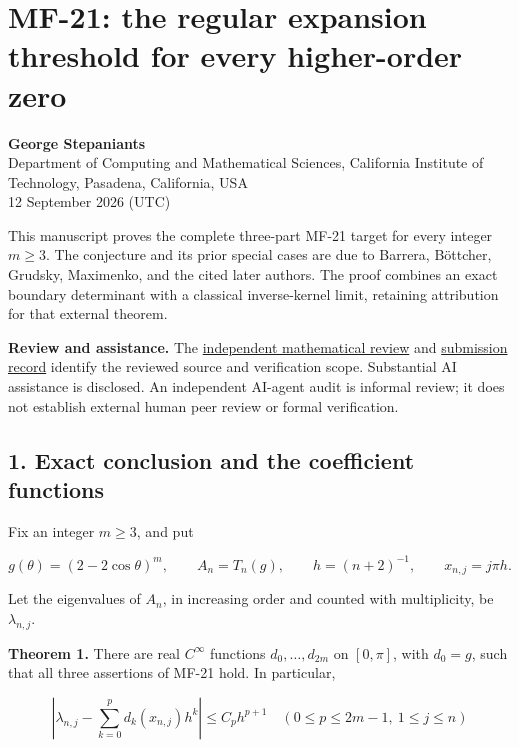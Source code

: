 \documentclass[10pt,a4paper]{article}
\begin{document}
\section*{MF-21: the regular expansion threshold for every higher-order zero}\label{mf-21-the-regular-expansion-threshold-for-every-higher-order-zero}

\textbf{George Stepaniants}\\
Department of Computing and Mathematical Sciences, California Institute of Technology, Pasadena, California, USA\\
12 September 2026 (UTC)

This manuscript proves the complete three-part MF-21 target for every integer \(m\ge3\). The conjecture and its prior special cases are due to Barrera, Böttcher, Grudsky, Maximenko, and the cited later authors. The proof combines an exact boundary determinant with a classical inverse-kernel limit, retaining attribution for that external theorem.

\textbf{Review and assistance.} The \href{https://github.com/ajt60gaibb/OpenProblemsInNLA/blob/main/references/stepaniants-mf21-2026-09-12/independent-review.md}{independent mathematical review} and \href{https://github.com/ajt60gaibb/OpenProblemsInNLA/blob/main/references/stepaniants-mf21-2026-09-12/README.md}{submission record} identify the reviewed source and verification scope. Substantial AI assistance is disclosed. An independent AI-agent audit is informal review; it does not establish external human peer review or formal verification.

\subsection{1. Exact conclusion and the coefficient functions}\label{exact-conclusion-and-the-coefficient-functions}

Fix an integer \(m\ge3\), and put

\nopagebreak[3]
\[
g(\theta)=(2-2\cos\theta)^m,\qquad A_n=T_n(g),\qquad h=(n+2)^{-1},\qquad x_{n,j}=j\pi h.
\]

Let the eigenvalues of \(A_n\), in increasing order and counted with multiplicity, be \(\lambda_{n,j}\).

\textbf{Theorem 1.} There are real \(C^\infty\) functions \(d_0,\ldots,d_{2m}\) on \([0,\pi]\), with \(d_0=g\), such that all three assertions of MF-21 hold. In particular,

\nopagebreak[3]
\[
\left|\lambda_{n,j}-\sum_{k=0}^{p}d_k(x_{n,j})h^k\right|\le C_p h^{p+1}
\quad(0\le p\le2m-1,\ 1\le j\le n)
\tag{1}
\]
\end{document}
